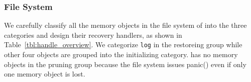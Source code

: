 
\subsubsection{File System}
\label{subsec:recoveryhandlerFS}
We carefully classify all the memory objects in the file system of {\sysname} into the three categories and design their recovery handlers, as shown in Table~\ref{tbl:handle_overview}.
We categorize \texttt{log} in the restoreing group while other four objects are grouped into the initializing category.
{\sysname} has no memory objects in the pruning group because the file system issues \textsf{panic()} even if only one memory object is lost.

